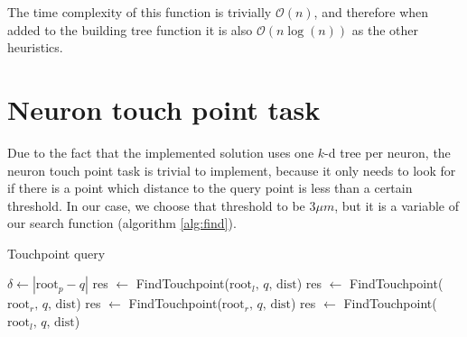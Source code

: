 The time complexity of this function is trivially $\mathcal{O}(n)$, and therefore when added to the building tree function it is also $\mathcal{O}(n\log{}(n))$ as the other heuristics.
\pagebreak

\section{Neuron touch point task}
Due to the fact that the implemented solution uses one $k$-d tree per neuron, the neuron touch point task is trivial to implement, because it only needs to look for if there is a point which distance to the query point is less than a certain threshold. In our case, we choose that threshold to be $3 \mu m$, but it is a variable of our search function (algorithm \ref{alg:find}).
\begin{algorithm}[h!]
    \caption{Touchpoint query
        \label{alg:find}}
    \begin{algorithmic}[1]
    \Statex
            \State {}
        \EndIf
        \State $\delta \gets |\text{root}_p - q|$
            \State {}
        \Else
                \State res $\gets$ FindTouchpoint($\text{root}_l,\, q,\, \text{dist}$)
                    \State {}
                \EndIf
                \State res $\gets$ FindTouchpoint($\text{root}_r,\, q,\, \text{dist}$)  \label{alg:find:begin1}
                    \State {}
                \EndIf \label{alg:find:end1}
            \Else
                \State res $\gets$ FindTouchpoint($\text{root}_r,\, q,\, \text{dist}$)
                    \State {}
                \EndIf
                \State res $\gets$ FindTouchpoint($\text{root}_l,\, q,\, \text{dist}$)  \label{alg:find:begin2}
                    \State {}
                \EndIf \label{alg:find:end2}
            \EndIf
            \State {}
        \EndIf
    \EndFunction
    \end{algorithmic}
\end{algorithm}


